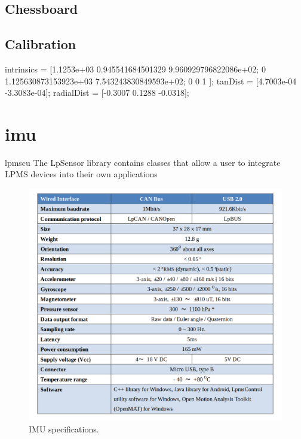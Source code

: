 \subsection{Chessboard}
\label{appendix:cha2:chessboard}

\subsection{Calibration}
intrinsics = [1.1253e+03 0.945541684501329     9.960929796822086e+02;
0		  1.125630873153923e+03 7.543243830849593e+02;
0        0                     1                    ];
tanDist = [4.7003e-04 -3.3083e-04];
radialDist = [-0.3007 0.1288 -0.0318];

\label{appendix:cha2:calibration}
\section{\acrlong{imu}}
\label{appendix:cha2:imu}
\acrfull{lpmscu} 
The LpSensor library contains classes that allow a user to integrate LPMS devices into their own applications
\begin{figure}[ht]
	\centering
	\includegraphics[width=\textwidth]{images/imuspecs.png}
	\caption[IMU specifications]{IMU specifications.}
	\label{appendix:cha2:eyescheme}
\end{figure}
